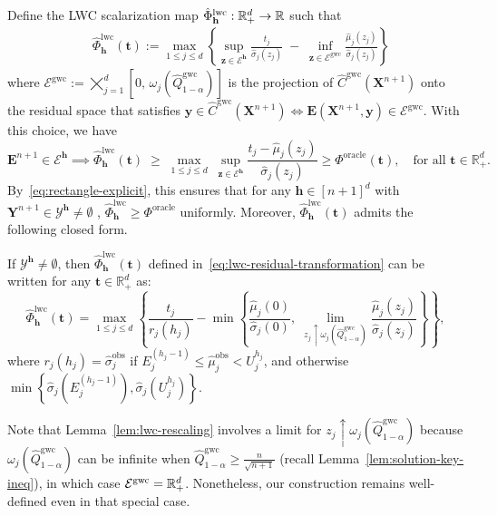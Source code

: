 Define the LWC scalarization map $\hat{\Phi}^{\mathrm{lwc}}_{\mathbf{h}}: \mathbb{R}^d_+ \to \mathbb{R}$ such that
\begin{align}
\label{eq:lwc-residual-transformation}
& \hat{\Phi}^{\mathrm{lwc}}_{\mathbf{h}}(\mathbf t)
:= \max_{1 \le j \le d}
\left\{
\sup_{\mathbf{z} \in \mathcal{E}^{\mathbf{h}}}\frac{t_j}{\hat{\sigma}_j(z_j)}
\;-\;
\inf_{\mathbf{z} \in \mathcal{E}^{\mathrm{gwc}}}\frac{\hat{\mu}_j(z_j)}{\hat{\sigma}_j(z_j)}
\right\}
\end{align}
where $\mathcal{E}^{\mathrm{gwc}}
:= 
\bigtimes_{j=1}^{d} \left[0,\, \omega_j(\hat{Q}^{\mathrm{gwc}}_{1-\alpha})\right]$ is the projection of $\hat{C}^\mathrm{gwc}(\mathbf{X}^{n+1})$ onto the residual space that satisfies $\mathbf y \in \hat{C}^\mathrm{gwc}(\mathbf{X}^{n+1}) \iff \mathbf E(\mathbf{X}^{n+1}, \mathbf y) \in \mathcal{E}^{\mathrm{gwc}}$. 
With this choice, we have
\begin{equation}
\mathbf{E}^{n+1}\in \mathcal{E}^{\mathbf{h}}\implies
\hat{\Phi}^{\mathrm{lwc}}_{\mathbf{h}}(\mathbf t)
\;\ge\;
\max_{1 \le j \le d}\;
\sup_{\mathbf{z}\in \mathcal{E}^{\mathbf{h}}}\frac{t_j-\hat{\mu}_j(z_j)}{\hat{\sigma}_j(z_j)} \geq \Phi^{\mathrm{oracle}}(\mathbf t),
\quad \text{for all } \mathbf t\in\mathbb{R}^d_+.
\label{eq:lwc-transformation-bound}
\end{equation}
By~\eqref{eq:rectangle-explicit}, this ensures that for any $\mathbf{h} \in [n+1]^d$ with $\mathbf{Y}^{n+1} \in \mathcal{Y}^{\mathbf{h}} \neq \emptyset$
, $\hat{\Phi}^{\mathrm{lwc}}_{\mathbf{h}}\geq \Phi^{\mathrm{oracle}}$ uniformly. Moreover, $\hat{\Phi}^{\mathrm{lwc}}_{\mathbf{h}}(\mathbf t)$ admits the following closed form.
\begin{lemma}
\label{lem:lwc-rescaling}
If $\mathcal{Y}^{\mathbf{h}}\neq \emptyset$, then $\hat{\Phi}^{\mathrm{lwc}}_{\mathbf{h}}(\mathbf t)$ defined in~\eqref{eq:lwc-residual-transformation} can be written for any $\mathbf t\in\mathbb{R}^d_+$ as:
\[
\hat{\Phi}^{\mathrm{lwc}}_{\mathbf{h}}(\mathbf t)
= \max_{1 \le j \le d}
\left\{
\frac{t_j}{r_j(h_j)}
-
\min\!\left\{
\frac{\hat{\mu}_j(0)}{\hat{\sigma}_j(0)},\;
\lim_{z_j \uparrow \omega_j(\hat{Q}^{\mathrm{gwc}}_{1-\alpha})}
\frac{\hat{\mu}_j(z_j)}{\hat{\sigma}_j(z_j)}
\right\}
\right\},
\]
where $r_j(h_j)=\hat{\sigma}^\mathrm{obs}_j$ if $E^{(h_j-1)}_j \leq \hat{\mu}^\mathrm{obs}_j < U^{h_j}_j$, and otherwise $\min\left\{\hat{\sigma}_j(E^{(h_j-1)}_j), \hat{\sigma}_j(U^{h_j}_j)\right\}$.
\end{lemma}
Note that Lemma~\ref{lem:lwc-rescaling} involves a limit for $z_j \uparrow \omega_j(\hat{Q}^{\mathrm{gwc}}_{1-\alpha})$ because $\omega_j(\hat{Q}^{\mathrm{gwc}}_{1-\alpha})$ can be infinite when $\hat{Q}^{\mathrm{gwc}}_{1-\alpha} \geq \frac{n}{\sqrt{n+1}}$ (recall Lemma~\ref{lem:solution-key-ineq}), in which case $\mathcal{E}^\mathrm{gwc} = \mathbb{R}^d_+$. 
Nonetheless, our construction remains well-defined even in that special case.


